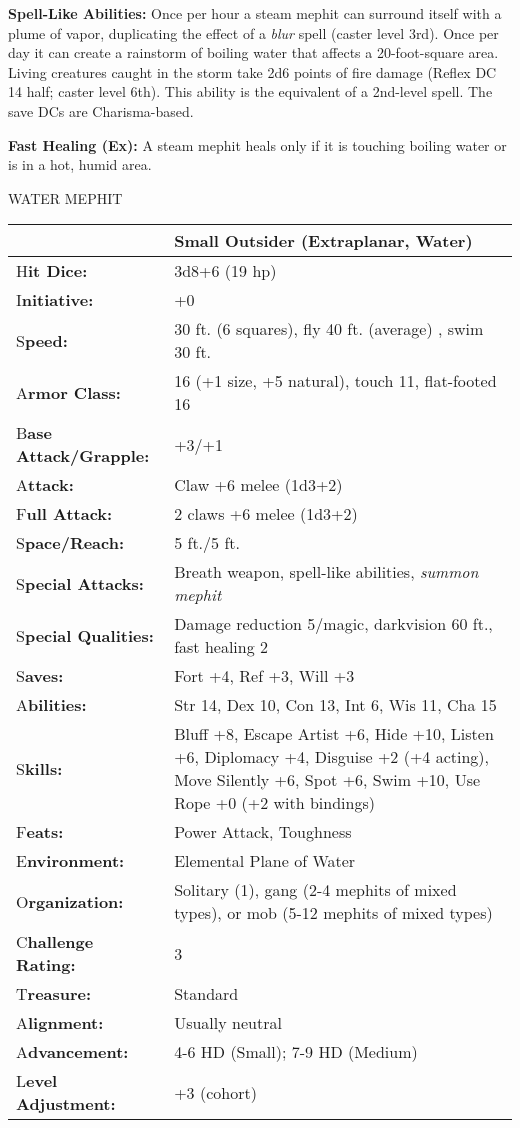 \documentclass{article}
\begin{document}
\textbf{Spell-Like Abilities: }Once per hour a steam mephit can surround itself 
with a plume of vapor, duplicating the effect of a \textit{blur }spell (caster 
level 3rd). Once per day it can create a rainstorm of boiling water that affects 
a 20-foot-square area. Living creatures caught in the storm take 2d6 points of 
fire damage (Reflex DC 14 half; caster level 6th). This ability is the equivalent 
of a 2nd-level spell. The save DCs are Charisma-based.

\textbf{Fast Healing (Ex): }A steam mephit heals only if it is touching boiling 
water or is in a hot, humid area.

\vspace{12pt}
WATER MEPHIT

\begin{tabular}{|>{\raggedright}p{91pt}|>{\raggedright}p{213pt}|}
\hline
  & Small Outsider (Extraplanar, Water)\tabularnewline
\hline
H\textbf{it Dice:} & 3d8+6 (19 hp)\tabularnewline
\hline
I\textbf{nitiative:} & +0\tabularnewline
\hline
S\textbf{peed:} & 30 ft. (6 squares), fly 40 ft. (average) , swim 30 ft.\tabularnewline
\hline
A\textbf{rmor Class:} & 16 (+1 size, +5 natural), touch 11, flat-footed 16\tabularnewline
\hline
B\textbf{ase Attack/Grapple:} & +3/+1\tabularnewline
\hline
A\textbf{ttack:} & Claw +6 melee (1d3+2)\tabularnewline
\hline
F\textbf{ull Attack:} & 2 claws +6 melee (1d3+2)\tabularnewline
\hline
S\textbf{pace/Reach:} & 5 ft./5 ft.\tabularnewline
\hline
S\textbf{pecial Attacks:} & Breath weapon, spell-like abilities, \textit{summon 
mephit}\tabularnewline
\hline
S\textbf{pecial Qualities:} & Damage reduction 5/magic, darkvision 60 ft., fast 
healing 2\tabularnewline
\hline
S\textbf{aves:} & Fort +4, Ref +3, Will +3\tabularnewline
\hline
A\textbf{bilities:} & Str 14, Dex 10, Con 13, Int 6, Wis 11, Cha 15\tabularnewline
\hline
S\textbf{kills:} & Bluff +8, Escape Artist +6, Hide +10, Listen +6, Diplomacy +4, 
Disguise +2 (+4 acting), Move Silently +6, Spot +6, Swim +10, Use Rope +0 (+2 with 
bindings)\tabularnewline
\hline
F\textbf{eats:} & Power Attack, Toughness\tabularnewline
\hline
E\textbf{nvironment:} & Elemental Plane of Water\tabularnewline
\hline
O\textbf{rganization:} & Solitary (1), gang (2-4 mephits of mixed types), or mob 
(5-12 mephits of mixed types)\tabularnewline
\hline
C\textbf{hallenge Rating:} & 3\tabularnewline
\hline
T\textbf{reasure:} & Standard\tabularnewline
\hline
A\textbf{lignment:} & Usually neutral\tabularnewline
\hline
A\textbf{dvancement:} & 4-6 HD (Small); 7-9 HD (Medium)\tabularnewline
\hline
L\textbf{evel Adjustment:} & +3 (cohort)\tabularnewline
\hline
\end{tabular}
\end{document}
